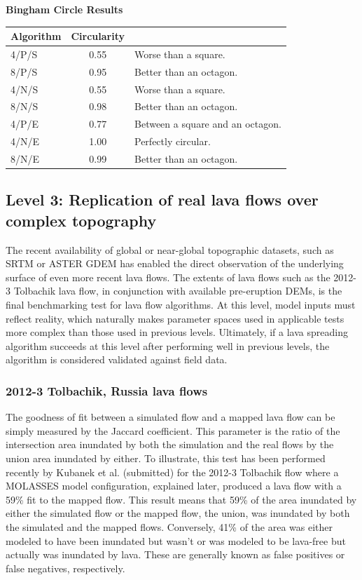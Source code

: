 \documentclass[12pt,letter]{article}
\begin{document}
		\begin{center}
			\textbf{Bingham Circle Results}\\
			\begin{tabular}{l c l}
				\toprule
				Algorithm&Circularity&\\
				\midrule
				4/P/S & 0.55 & Worse than a square.\\
				8/P/S & 0.95 & Better than an octagon.\\
				4/N/S & 0.55 & Worse than a square.\\
				8/N/S & 0.98 & Better than an octagon.\\
				4/P/E & 0.77 & Between a square and an octagon.\\
				4/N/E & 1.00 & Perfectly circular.\\
				8/N/E & 0.99 & Better than an octagon.\\
				
				\bottomrule
			\end{tabular}
		\end{center}
		
	\subsection{Level 3: Replication of real lava flows over complex topography}
		The recent availability of global or near-global topographic datasets, such as SRTM or ASTER GDEM has enabled the direct observation of the underlying surface of even more recent lava flows. The extents of lava flows such as the 2012-3 Tolbachik lava flow, in conjunction with available pre-eruption DEMs, is the final benchmarking test for lava flow algorithms. At this level, model inputs must reflect reality, which naturally makes parameter spaces used in applicable tests more complex than those used in previous levels. Ultimately, if a lava spreading algorithm succeeds at this level after performing well in previous levels, the algorithm is considered validated against field data.

		\subsubsection{2012-3 Tolbachik, Russia lava flows}\label{test:Real_Tolbachik}
			The goodness of fit between a simulated flow and a mapped lava flow can be simply measured by the Jaccard coefficient. This parameter is the ratio of the intersection area inundated by both the simulation and the real flows by the union area inundated by either. To illustrate, this test has been performed recently by Kubanek et al. (submitted) for the 2012-3 Tolbachik flow where a MOLASSES model configuration, explained later, produced a lava flow with a 59\% fit to the mapped flow. This result means that 59\% of the area inundated by either the simulated flow or the mapped flow, the union, was inundated by both the simulated and the mapped flows. Conversely, 41\% of the area was either modeled to have been inundated but wasn't or was modeled to be lava-free but actually was inundated by lava. These are generally known as false positives or false negatives, respectively.
			
\end{document}
